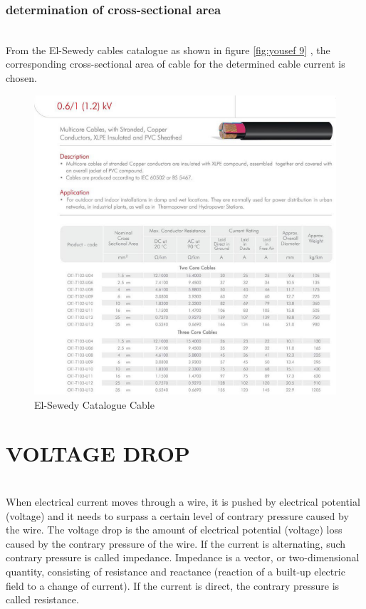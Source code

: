 \documentclass[12pt,fleqn]{book} %
\begin{document}
       \subsubsection {determination of cross-sectional area}
       \\ From the El-Sewedy cables catalogue as shown in figure \ref{fig:yousef 9} , the corresponding cross-sectional area of cable for the determined cable current is chosen.
        \begin{figure}[h!]
    \centering
    \includegraphics[width=1\linewidth]{yousef 8.png}
    \caption{  El-Sewedy Catalogue Cable}
    \label{fig:yousef8}
\end{figure}
      
       
\section {VOLTAGE DROP  }
\\When electrical current moves through a wire, it is pushed by electrical potential (voltage) and it needs to surpass a certain level of contrary pressure caused by the wire. The voltage drop is the amount of electrical potential (voltage) loss caused by the contrary pressure of the wire. If the current is alternating, such contrary pressure is called impedance. Impedance is a vector, or two-dimensional quantity, consisting of resistance and reactance (reaction of a built-up electric field to a change of current). If the current is direct, the contrary pressure is called resistance.
\end{document}
